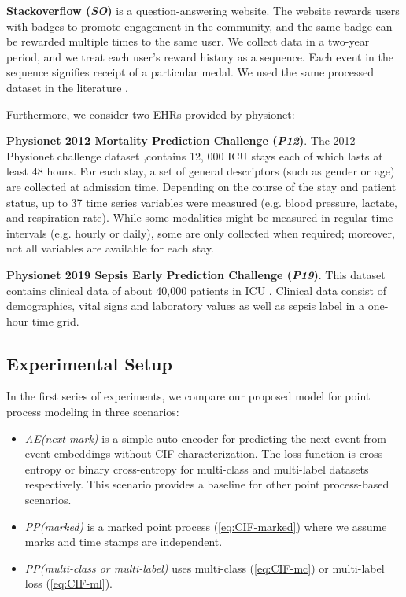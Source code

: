 \documentclass[journal,twoside,web]{ieeecolor}
\begin{document}
\textbf{Stackoverflow (\emph{SO})} is a question-answering website. The website rewards users with badges to promote engagement in the community, and the same badge can be rewarded multiple times to the same user. We collect data in a two-year period, and we treat each user’s reward history as a sequence. Each event in the sequence signifies receipt of a particular medal. We used the same processed dataset in the literature \cite*{zuoTransformerHawkesProcess2020a}.

Furthermore, we consider two EHRs provided by physionet:

\textbf{Physionet 2012 Mortality Prediction Challenge (\emph{P12})}.
The 2012 Physionet challenge dataset \cite*{silvaPredictingInHospitalMortality},contains 12, 000 ICU stays each of which lasts at least 48 hours. For each stay, a set of general descriptors (such as gender or age) are collected at admission time. Depending on the course of the stay and patient status, up to 37 time series variables were measured (e.g. blood pressure, lactate, and respiration rate). While some modalities might be measured in regular time intervals (e.g. hourly or daily), some are only collected when required; moreover, not all variables are available for each stay.

\textbf{Physionet 2019 Sepsis Early Prediction Challenge (\emph{P19})}.
This dataset contains clinical data of about 40,000 patients in ICU \cite*{reynaEarlyPredictionSepsis2020}. Clinical data consist of demographics, vital signs and laboratory values as well as sepsis label in a one-hour time grid.


\subsection*{Experimental Setup}

In the first series of experiments, we compare our proposed model for point process modeling in three scenarios:

\begin{itemize}
    \item \emph{AE(next mark)} is a simple auto-encoder for predicting the next event from event embeddings without CIF characterization. The loss function is cross-entropy or binary cross-entropy for multi-class and multi-label datasets respectively. This scenario provides a baseline for other point process-based scenarios.
    \item \emph{PP(marked)} is a marked point process (\ref*{eq:CIF-marked}) where we assume marks and time stamps are independent.
    \item \emph{PP(multi-class or multi-label)} uses multi-class (\ref*{eq:CIF-mc}) or multi-label loss (\ref*{eq:CIF-ml}).
\end{itemize}
\end{document}
